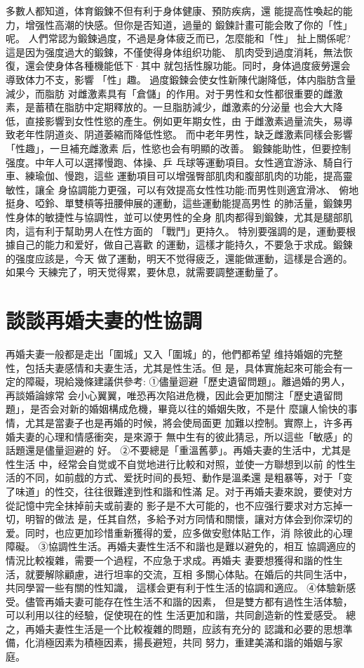 \documentclass[12pt,UTF8]{ctexbook}
\begin{document}
多數人都知道，体育鍛鍊不但有利于身体健康、預防疾病，還
能提高性喚起的能力，增强性高潮的快感。但你是否知道，過量的
鍛鍊計畫可能会敗了你的「性」呢。
人們常認为鍛鍊過度，不過是身体疲乏而已，怎麼能和「性」
扯上關係呢?這是因为强度過大的鍛鍊，不僅使得身体组织功能、
肌肉受到過度消耗，無法恢復，還会使身体各種機能低下·其中
就包括性腺功能。同时，身体過度疲勞還会導致体力不支，影響
「性」趣。
過度鍛鍊会使女性新陳代謝降低，体内脂肪含量減少，而脂肪
对雌激素具有「倉儲」的作用。对于男性和女性都很重要的雌激
素，是蓄積在脂肪中定期釋放的。一旦脂肪減少，雌激素的分泌量
也会大大降低，直接影響到女性性慾的產生。例如更年期女性，由
于雌激素過量流失，易導致老年性阴道炎、阴道萎縮而降低性慾。
而中老年男性，缺乏雌激素同樣会影響「性趣」，一旦補充雌激素
后，性慾也会有明顯的改善。
鍛鍊能助性，但要控制强度。中年人可以選擇慢跑、体操、乒
乓球等運動項目。女性適宜游泳、騎自行車、練瑜伽、慢跑，這些
運動項目可以增强臀部肌肉和腹部肌肉的功能，提高靈敏性，讓全
身協調能力更强，可以有效提高女性性功能:而男性则適宜滑冰、
俯地挺身、啞鈴、單雙槓等扭腰伸展的運動，這些運動能提高男性
的肺活量，鍛鍊男性身体的敏捷性与協調性，並可以使男性的全身
肌肉都得到鍛鍊，尤其是腿部肌肉，這有利于幫助男人在性方面的
「戰鬥」更持久。
特別要强調的是，運動要根據自己的能力和爱好，做自己喜歡
的運動，這樣才能持久，不要急于求成。鍛鍊的强度应該是，今天
做了運動，明天不觉得疲乏，還能做運動，這樣是合適的。如果今
天練完了，明天觉得累，要休息，就需要調整運動量了。

\section{談談再婚夫妻的性協調}

再婚夫妻一般都是走出「圍城」又入「圍城」的，他們都希望
维持婚姻的完整性，包括夫妻感情和夫妻生活，尤其是性生活。但
是，具体實施起來可能会有一定的障礙，現給幾條建議供參考:
①儘量迴避「歷史遺留問題」。離過婚的男人，再談婚論嫁常
会小心翼翼，唯恐再次陷进危機，因此会更加關注「歷史遺留問
題」，是否会对新的婚姻構成危機，畢竟以往的婚姻失敗，不是什
麼讓人愉快的事情，尤其是當妻子也是再婚的时候，將会使局面更
加難以控制。實際上，许多再婚夫妻的心理和情感衝突，是來源于
無中生有的彼此猜忌，所以這些「敏感」的話題還是儘量迴避的
好。
②不要總是「重溫舊夢」。再婚夫妻的生活中，尤其是性生活
中，经常会自觉或不自觉地进行比較和对照，並使一方聯想到以前
的性生活的不同，如前戲的方式、爱抚时间的長短、動作是溫柔還
是粗暴等，对于「变了味道」的性交，往往很難達到性和諧和性滿
足。对于再婚夫妻來說，要使对方從記憶中完全抹掉前夫或前妻的
影子是不大可能的，也不应强行要求对方忘掉一切，明智的做法
是，任其自然，多給予对方同情和關懷，讓对方体会到你深切的
爱。同时，也应更加珍惜重新獲得的爱，应多做安慰体貼工作，消
除彼此的心理障礙。
③協調性生活。再婚夫妻性生活不和諧也是難以避免的，相互
協調適应的情況比較複雜，需要一个過程，不应急于求成。再婚夫
妻要想獲得和諧的性生活，就要解除顧慮，进行坦率的交流，互相
多關心体貼。在婚后的共同生活中，共同學習一些有關的性知識，
這樣会更有利于性生活的協調和適应。
④体驗新感受。儘管再婚夫妻可能存在性生活不和諧的因素，
但是雙方都有過性生活体驗，可以利用以往的经驗，促使現在的性
生活更加和諧，共同創造新的性爱感受。
總之，再婚夫妻性生活是一个比較複雜的問題，应該有充分的
認識和必要的思想準備，化消極因素为積極因素，揚長避短，共同
努力，重建美滿和諧的婚姻与家庭。
\end{document}
